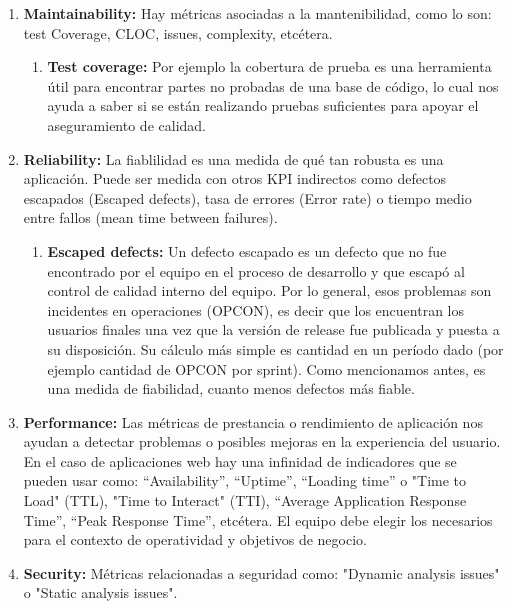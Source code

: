   \begin{enumerate}    

  \item {\textbf{Maintainability:} Hay métricas asociadas a la mantenibilidad, como lo son: test Coverage, CLOC, issues, complexity,  etcétera. 
  
    \begin{enumerate}    
    \item {\textbf{Test coverage:}
Por ejemplo la cobertura de prueba es una herramienta útil para encontrar partes no probadas de una base de código, lo cual nos ayuda a saber si se están realizando pruebas suficientes para apoyar el aseguramiento de calidad.
}
  \end{enumerate}
}

  \item {\textbf{Reliability:} La fiablilidad es una medida de qué tan robusta es una aplicación. Puede ser medida con otros KPI indirectos como defectos escapados (Escaped defects), tasa de errores (Error rate) o tiempo medio entre fallos (mean time between failures).
  
  \begin{enumerate}    
    \item {\textbf{Escaped defects:}
Un defecto escapado es un defecto que no fue encontrado por el equipo en el proceso de desarrollo y que escapó al control de calidad interno del equipo. Por lo general, esos problemas son incidentes en operaciones (OPCON), es decir que los encuentran los usuarios finales una vez que la versión de release fue publicada y puesta a su disposición. Su cálculo más simple es cantidad en un período dado (por ejemplo cantidad de OPCON por sprint). Como mencionamos antes, es una medida de fiabilidad, cuanto menos defectos más fiable.
}
  \end{enumerate}
  }


  \item {\textbf{Performance:}
Las métricas de prestancia o rendimiento de aplicación nos ayudan a detectar problemas o posibles mejoras en la experiencia del usuario. En el caso de aplicaciones web hay una infinidad de indicadores que se pueden usar como: “Availability”, “Uptime”, “Loading time” o "Time to Load" (TTL), "Time to Interact" (TTI), “Average Application Response Time”, “Peak Response Time”, etcétera. El equipo debe elegir los necesarios para el contexto de operatividad y objetivos de negocio.
}

  \item {\textbf{Security:}
  Métricas relacionadas a seguridad como: "Dynamic analysis issues" o "Static analysis issues".
}

  \end{enumerate}

